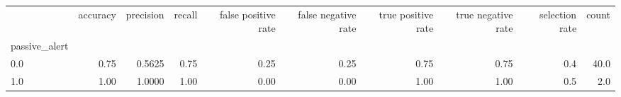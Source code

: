 \begin{tabular}{lrrrrrrrrr}
\toprule
{} &  accuracy &  precision &  recall &  false positive rate &  false negative rate &  true positive rate &  true negative rate &  selection rate &  count \\
passive\_alert &           &            &         &                      &                      &                     &                     &                 &        \\
\midrule
0.0           &      0.75 &     0.5625 &    0.75 &                 0.25 &                 0.25 &                0.75 &                0.75 &             0.4 &   40.0 \\
1.0           &      1.00 &     1.0000 &    1.00 &                 0.00 &                 0.00 &                1.00 &                1.00 &             0.5 &    2.0 \\
\bottomrule
\end{tabular}

